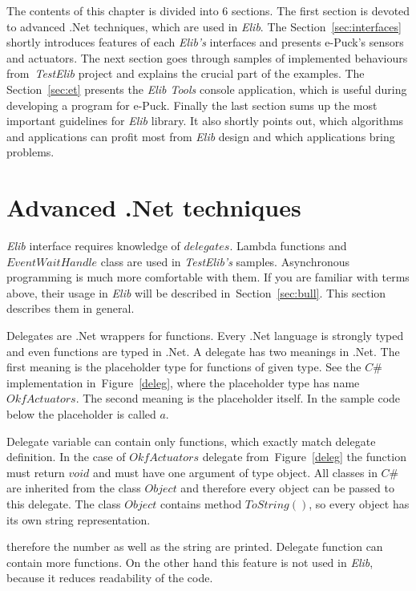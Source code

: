   The contents of this chapter is divided into 6 sections.
  The first section is devoted to advanced .Net techniques, which are used in {\it Elib}.
  The Section~\ref{sec:interfaces} shortly introduces features of each {\it Elib's} interfaces and 
   presents e-Puck's sensors and actuators.
  The next section goes through samples of implemented behaviours 
  from~{\it TestElib} project and explains the crucial part of the examples.
  The Section~\ref{sec:et} presents the {\it Elib Tools} console application, 
  which is useful during developing a program for e-Puck.
  Finally the last section sums up the most important guidelines for {\it Elib} library.
  It also shortly points out, which algorithms and applications can profit most
  from {\it Elib} design and which applications bring problems.
  
\section{Advanced .Net techniques} \label{sec:net}
  {\it Elib} interface requires knowledge of $delegates$. 
  Lambda functions and $EventWaitHandle$ class
  are used in {\it TestElib's} samples. 
  Asynchronous programming is much more comfortable with them.
  If you are familiar with terms above, their usage in {\it Elib} will be described 
  in~Section~\ref{sec:bull}.
  This section describes them in general.

  Delegates are .Net wrappers for functions. Every .Net language is strongly typed and even functions are typed in .Net.
  A delegate has two meanings in .Net. The first meaning is the placeholder type for functions of given type. 
  See the $C\#$ implementation in~Figure~\ref{deleg}, where the placeholder type has name $OkfActuators$.
  The second meaning is the placeholder itself. In the sample code below the placeholder is called $a$.

  Delegate variable can contain only functions, which exactly match delegate definition. In the case of $OkfActuators$ 
  delegate from~Figure~\ref{deleg} the function must return
  $void$ and must have one argument of type object. All classes in $C\#$ 
  are inherited from the class $Object$ and therefore every object can be passed to this delegate. 
  The class $Object$ contains method $ToString()$, 
  so every object has its own string representation.
  
  therefore the number as well as the string are printed.  
  Delegate function can contain more functions. On the other hand this feature is not used in {\it Elib}, 
  because it reduces readability of the code.
  

